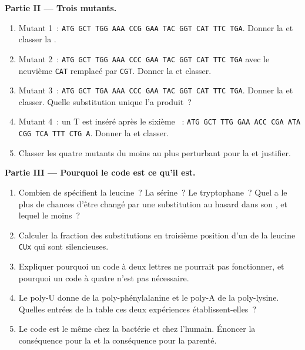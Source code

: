 \begin{problem}
\medskip
\noindent\textbf{Partie II --- Trois mutants.}
\begin{enumerate}[resume]
  \item Mutant 1~: \texttt{ATG GCT TGG AAA CCG GAA TAC GGT CAT TTC TGA}.
        Donner la  et classer la .
  \item Mutant 2~: \texttt{ATG GCT TGG AAA CCC GAA TAC GGT CAT TTC TGA}
        avec le neuvième  \texttt{CAT} remplacé par \texttt{CGT}.
        Donner la  et classer.
  \item Mutant 3~: \texttt{ATG GCT TGA AAA CCC GAA TAC GGT CAT TTC TGA}.
        Donner la  et classer. Quelle substitution unique l'a
        produit~?
  \item Mutant 4~: un T est inséré après le sixième ~:
        \texttt{ATG GCT TTG GAA ACC CGA ATA CGG TCA TTT CTG A}. Donner
        la  et classer.
  \item Classer les quatre mutants du moins au plus perturbant pour la
         et justifier.
\end{enumerate}

\medskip
\noindent\textbf{Partie III --- Pourquoi le code est ce qu'il est.}
\begin{enumerate}[resume]
  \item Combien de  spécifient la leucine~? La sérine~? Le
        tryptophane~? Quel  a le plus de chances d'être
        changé par une substitution au hasard dans son , et lequel
        le moins~?
  \item Calculer la fraction des substitutions en troisième position
        d'un  de la leucine \texttt{CUx} qui sont silencieuses.
  \item Expliquer pourquoi un code à deux lettres ne pourrait pas
        fonctionner, et pourquoi un code à quatre n'est pas nécessaire.
  \item Le poly-U donne de la poly-phénylalanine et le poly-A de la
        poly-lysine. Quelles entrées de la table ces deux expériences
        établissent-elles~?
  \item Le code est le même chez la bactérie et chez l'humain. Énoncer
        la conséquence pour la  et la conséquence pour la
        parenté.
\end{enumerate}


\end{problem}
